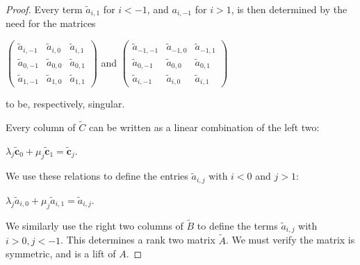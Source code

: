 \documentclass{article}
\begin{document}
\begin{proof}
  Every term $\tilde{a}_{i,1}$ for $i < -1$, and $a_{i,-1}$ for $i > 1$, is then determined by the need for the matrices 
  \begin{center}
    $\left(\begin{array}{ccc} \tilde{a}_{i,-1} & \tilde{a}_{i,0} & \tilde{a}_{i,1} \\ \tilde{a}_{0,-1} & \tilde{a}_{0,0} & \tilde{a}_{0,1} \\ \tilde{a}_{1,-1} & \tilde{a}_{1,0} & \tilde{a}_{1,1} \end{array}\right)$ \hspace{.1 in} and \hspace{.1 in} $\left(\begin{array}{ccc} \tilde{a}_{-1,-1} & \tilde{a}_{-1,0} & \tilde{a}_{-1,1} \\ \tilde{a}_{0,-1} & \tilde{a}_{0,0} & \tilde{a}_{0,1} \\ \tilde{a}_{i,-1} & \tilde{a}_{i,0} & \tilde{a}_{i,1}\end{array}\right)$
  \end{center}
  to be, respectively, singular.
  
  Every column of $\tilde{C}$ can be written as a linear combination of the left two:
  \begin{center}
    $\lambda_{j}\tilde{\textbf{c}}_{0} + \mu_{j}\tilde{\textbf{c}}_{1} = \tilde{\textbf{c}}_{j}$.  
  \end{center}
  We use these relations to define the entries $\tilde{a}_{i,j}$ with $i < 0$ and $j > 1$:
  \begin{center}
    $\lambda_{j}\tilde{a}_{i,0} + \mu_{j}\tilde{a}_{i,1} = \tilde{a}_{i,j}$.
  \end{center}
  We similarly use the right two columns of $\tilde{B}$ to define the terms $\tilde{a}_{i,j}$ with $i > 0, j < -1$. This determines a rank two matrix $\tilde{A}$. We must verify the matrix is symmetric, and is a lift of $A$.
  

\end{proof}
\end{document}
